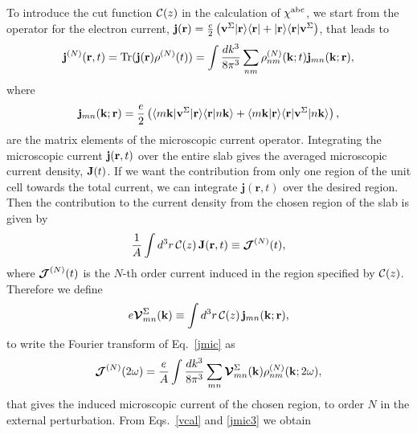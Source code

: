 \documentclass[floatfix,prb,aps,superscriptaddress,11pt,preprint,letterpaper]{revtex4}
\begin{document}
To introduce the
cut function ${\mathbf{\cal C}}(z)$ in
the calculation of $\chi^{\mathrm{a}\mathrm{b}\mathrm{c}}$, we start from 
the operator for the electron current,
$\mathbf{j}(\mathbf{r})=\frac{e}{2}\left(\mathbf{v}^\Sigma| \mathbf{r} \rangle\langle \mathbf{r} |
+| \mathbf{r} \rangle\langle \mathbf{r} |\mathbf{v}^\Sigma\right)$, that leads to
\begin{align}\label{jmic}
\mathbf{j}^{(N)}(\mathbf{r},t)=\mathrm{Tr}(\mathbf{j}(\mathbf{r})\rho^{(N)}(t))
=
\int \frac{dk^3}{8\pi^3}
\sum_{nm}
\rho^{(N)}_{nm}(\mathbf{k};t)\mathbf{j}_{mn}(\mathbf{k};\mathbf{r})
,
\end{align}
where 
\begin{equation}\label{jmic3}
\mathbf{j}_{mn}(\mathbf{k};\mathbf{r})=
\frac{e}{2}
\left(
\langle m\mathbf{k} |\mathbf{v}^\Sigma| \mathbf{r} \rangle\langle {\mathbf{r}} | {n\mathbf{k}} \rangle
+
\langle {m\mathbf{k}} | {\mathbf{r}} \rangle\langle \mathbf{r} |\mathbf{v}^\Sigma| n\mathbf{k} \rangle
\right),
\end{equation}
are the matrix elements of the microscopic current operator.
Integrating the microscopic current $\mathbf{j}(\mathbf{r},t)$ over
the entire slab gives the averaged microscopic current density, $\mathbf{J}(t)$. 
If we want the contribution from only one region of the unit cell 
towards the total current, we can integrate $\mathbf{j}({\mathbf r},t)$ 
over the desired region. Then the contribution 
to the current density from the
chosen region of the slab is given by
\begin{equation}\label{jsz}
\frac{1}{A}\int d^3r\, {\mathbf{\cal C}}(z)\, 
\mathbf{J} (\mathbf{r},t)
 \equiv \boldsymbol{\mathcal{\cal J}}^{(N)}(t),
\end{equation}
where $\boldsymbol{\mathcal{\cal J}}^{(N)}(t)$ is the $N$-th order current induced in the
region specified by ${\mathbf{\cal C}}(z)$.
Therefore we define
\begin{equation}\label{vcal}
e{\boldsymbol{\mathcal{V}}}^{\Sigma}_{mn}(\mathbf{k})
\equiv
\int d^3r\, {\mathbf{\cal C}}(z)\,\mathbf{j}_{mn}({\mathbf{k}};\mathbf{r}),
\end{equation}
to write the Fourier transform of Eq.~\eqref{jmic} as
\begin{equation}\label{jmac2}
\boldsymbol{\mathcal{\cal J}}^{(N)}(2\omega)=\frac{e}{A}
\int \frac{dk^3}{8\pi^3}
\sum_{mn}
\boldsymbol{\mathcal{\cal V}}^{\Sigma}_{mn}(\mathbf{k}) 
\rho^{(N)}_{nm}(\mathbf{k};2\omega) 
, 
\end{equation}
that gives the induced microscopic current of the chosen region, to order $N$ 
in the external perturbation. 
From
Eqs.~\eqref{vcal} and \eqref{jmic3} we obtain
\end{document}
